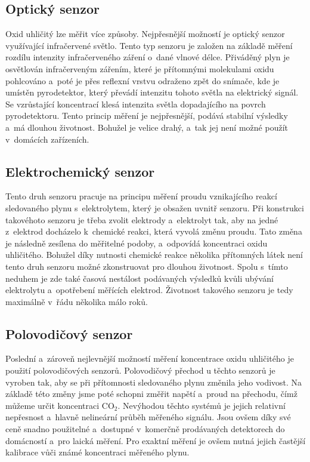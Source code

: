 \subsection{Optický senzor}

Oxid uhličitý lze měřit více způsoby. Nejpřesnější možností je optický senzor využívající infračervené světlo. Tento typ senzoru je založen na základě měření rozdílu intenzity infračerveného záření o~dané vlnové délce. Přiváděný plyn je osvětlován infračerveným zářením, které je přítomnými molekulami oxidu pohlcováno a~poté je přes reflexní vrstvu odraženo zpět do snímače, kde je umístěn pyrodetektor, který převádí intenzitu tohoto světla na elektrický signál. Se vzrůstající koncentrací klesá intenzita světla dopadajícího na povrch pyrodetektoru. Tento princip měření je nejpřesnější, podává stabilní výsledky a~má dlouhou životnost. Bohužel je velice drahý, a~tak jej není možné použít v~domácích zařízeních.

\subsection{Elektrochemický senzor}

Tento druh senzoru pracuje na principu měření proudu vznikajícího reakcí sledovaného plynu s~elektrolytem, který je obsažen uvnitř senzoru. Při konstrukci takovéhoto senzoru je třeba zvolit elektrody a~elektrolyt tak, aby na jedné z~elektrod docházelo k~chemické reakci, která vyvolá změnu proudu. Tato změna je následně zesílena do měřitelné podoby, a~odpovídá koncentraci oxidu uhličitého. Bohužel díky nutnosti chemické reakce několika přítomných látek není tento druh senzoru možné zkonstruovat pro dlouhou životnost. Spolu s~tímto neduhem je zde také časová nestálost podávaných výsledků kvůli ubývání elektrolytu a~opotřebení měřících elektrod. Životnost takového senzoru je tedy maximálně v~řádu několika málo roků. 

\subsection{Polovodičový senzor}

Poslední a~zároveň nejlevnější možností měření koncentrace oxidu uhličitého je použití polovodičových senzorů. Polovodičový přechod u těchto senzorů je vyroben tak, aby se při přítomnosti sledovaného plynu změnila jeho vodivost. Na základě této změny jsme poté schopni změřit napětí a~proud na přechodu, čímž můžeme určit koncentraci CO$_2$. Nevýhodou těchto systémů je jejich relativní nepřesnost a~hlavně nelineární průběh měřeného signálu. Jsou ovšem díky své ceně snadno použitelné a~dostupné v~komerčně prodávaných detektorech do domácností a~pro laická měření. Pro exaktní měření je ovšem nutná jejich častější kalibrace vůči známé koncentraci měřeného plynu.

